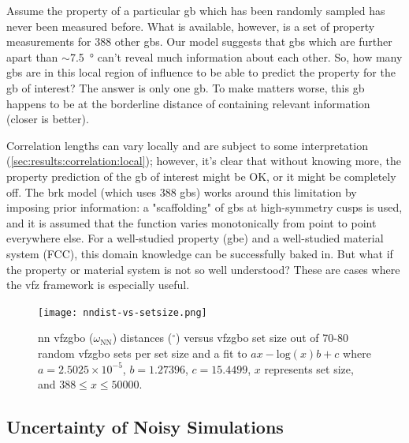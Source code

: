 \documentclass[final,twocolumn,12pt]{elsarticle}
\begin{document}
	Assume the property of a particular \gls{gb} which has been randomly sampled has never been measured before. What is available, however, is a set of property measurements for \num{388} other \glspl{gb}. Our model suggests that \glspl{gb} which are further apart than $\sim$\SI{7.5}{\degree} can't reveal much information about each other. So, how many \glspl{gb} are in this local region of influence to be able to predict the property for the \gls{gb} of interest? The answer is only one \gls{gb}. To make matters worse, this \gls{gb} happens to be at the borderline distance of containing relevant information (closer is better).
	
	Correlation lengths can vary locally and are subject to some interpretation (\cref{sec:results:correlation:local}); however, it's clear that without knowing more, the property prediction of the \gls{gb} of interest might be OK, or it might be completely off. The \gls{brk} \cite{bulatovGrainBoundaryEnergy2014} model (which uses \num{388} \glspl{gb}) works around this limitation by imposing prior information: a "scaffolding" of \glspl{gb} at high-symmetry cusps is used, and it is assumed that the function varies monotonically from point to point everywhere else. For a well-studied property (\gls{gbe}) and a well-studied material system (FCC), this domain knowledge can be successfully baked in. But what if the property or material system is not so well understood? These are cases where the \gls{vfz} framework is especially useful.

	\begin{figure}
		\centering
		\texttt{[image: nndist-vs-setsize.png]}
		\caption{\Gls{nn} \gls{vfzgbo} ($\omega_{\text{NN}}$) distances ($^{\circ}$) versus \gls{vfzgbo} set size out of 70-80 random \gls{vfzgbo} sets per set size and a fit to $ax-\mathrm{log}(x)b+c$ where $a=2.5025\times10^{-5}$, $b=1.27396$, $c=15.4499$, $x$ represents set size, and $388 \leq x \leq 50000$.}
		\label{fig:nndist-vs-setsize}
	\end{figure}

	\subsection{Uncertainty of Noisy  Simulations} \label{sec:results:error}
	
\end{document}
